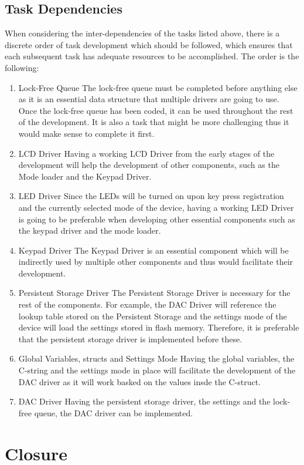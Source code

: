 \documentclass[11pt,a4paper
]{scrartcl}
\begin{document}
\subsection{Task Dependencies}
When considering the inter-dependencies of the tasks listed above, there is a discrete order of task development which should be followed, which ensures that each subsequent task
has adequate resources to be accomplished. The order is the following:
\begin{enumerate}
    \item Lock-Free Queue
    The lock-free queue must be completed before anything else as it is an essential data structure that multiple drivers are going to use. Once the lock-free queue has been
    coded, it can be used throughout the rest of the development.
    It is also a task that might be more challenging thus it would make sense to complete it first.
    \item LCD Driver
    Having a working LCD Driver from the early stages of the development will help the development of other components, such as the Mode loader and the Keypad Driver.
    \item LED Driver
    Since the LEDs will be turned on upon key press registration and the currently selected mode of the device, having a working LED Driver is going to be preferable when developing
    other essential components such as the keypad driver and the mode loader.
    \item Keypad Driver
    The Keypad Driver is an essential component which will be indirectly used by multiple other components and thus would facilitate their development.
    \item Persistent Storage Driver
    The Persistent Storage Driver is necessary for the rest of the components. For example, the DAC Driver will reference the lookup table stored on the Persistent Storage and
    the settings mode of the device will load the settings stored in flash memory. Therefore, it is preferable that the persistent storage driver is implemented before these.
    \item Global Variables, structs and Settings Mode
    Having the global variables, the C-string and the settings mode in place will facilitate the development of the DAC driver as it will work basked on the values insde the C-struct.
    \item DAC Driver
    Having the persistent storage driver, the settings and the lock-free queue, the DAC driver can be implemented.
\end{enumerate}

\section{Closure}



\end{document}

